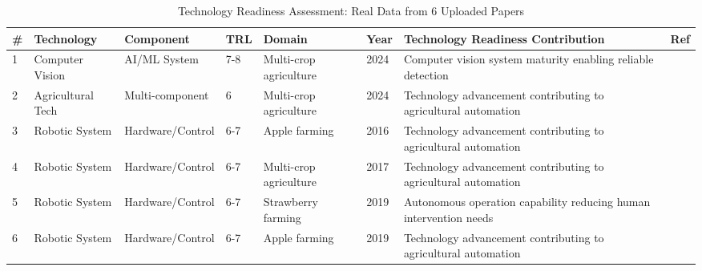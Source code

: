 \begin{table*}[htbp]
\centering
\small
\caption{Technology Readiness Assessment: Real Data from 6 Uploaded Papers}
\label{tab:real_technology_readiness_comprehensive}
\begin{tabular}{p{}p{}p{}p{}p{}p{}p{}p{}}
\toprule
\textbf{\#} & \textbf{Technology} & \textbf{Component} & \textbf{TRL} & \textbf{Domain} & \textbf{Year} & \textbf{Technology Readiness Contribution} & \textbf{Ref} \\ \midrule
 1 & Computer Vision & AI/ML System & 7-8 & Multi-crop agriculture & 2024 & Computer vision system maturity enabling reliable detection & \cite{Ting:2024_ieee} \\
 2 & Agricultural Tech & Multi-component & 6 & Multi-crop agriculture & 2024 & Technology advancement contributing to agricultural automation & \cite{precis2024berry} \\
 3 & Robotic System & Hardware/Control & 6-7 & Apple farming & 2016 & Technology advancement contributing to agricultural automation & \cite{li2016reconfigurable} \\
 4 & Robotic System & Hardware/Control & 6-7 & Multi-crop agriculture & 2017 & Technology advancement contributing to agricultural automation & \cite{Chan:2017_aw} \\
 5 & Robotic System & Hardware/Control & 6-7 & Strawberry farming & 2019 & Autonomous operation capability reducing human intervention needs & \cite{xiong2019development} \\
 6 & Robotic System & Hardware/Control & 6-7 & Apple farming & 2019 & Technology advancement contributing to agricultural automation & \cite{mark2019ethics} \\
\bottomrule
\end{tabular}
\end{table*}


